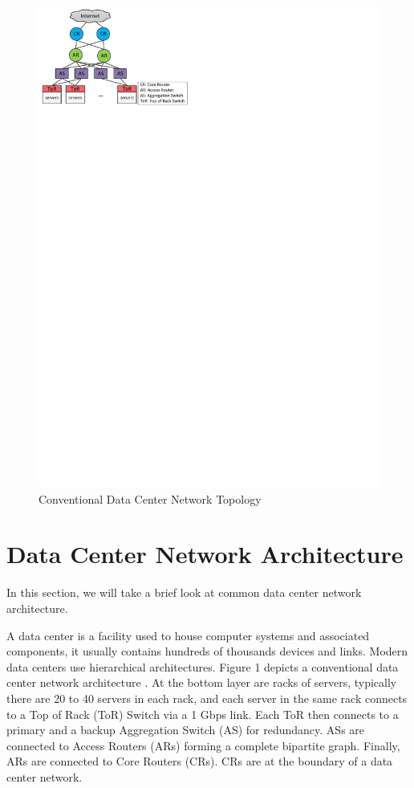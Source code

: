 \documentclass{sig-alternate-05-2015}
\begin{document}
\begin{figure}[t]
\centering
\includegraphics{topology}
\caption{Conventional Data Center Network Topology}
\end{figure}

\section{Data Center Network Architecture}
In this section, we will take a brief look at common data center network architecture.

A data center is a facility used to house computer systems and associated components, it usually contains hundreds of thousands devices and links. Modern data centers use hierarchical architectures. Figure 1 depicts a conventional data center network architecture \cite{gill2011understanding}\cite{greenberg2009vl2}\cite{herodotou2014scalable}. At the bottom layer are racks of servers, typically there are 20 to 40 servers in each rack, and each server in the same rack connects to a Top of Rack (ToR) Switch via a 1 Gbps link. Each ToR then connects to a primary and a backup Aggregation Switch (AS) for redundancy. ASs are connected to Access Routers (ARs) forming a complete bipartite graph. Finally, ARs are connected to Core Routers (CRs). CRs are at the boundary of a data center network.
\end{document}
